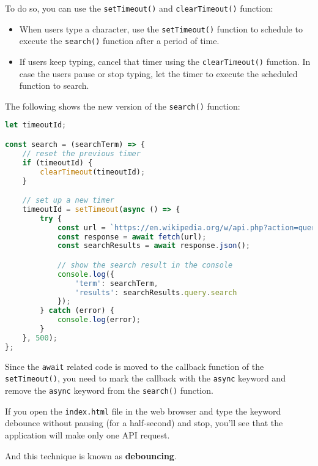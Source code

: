 \documentclass[11pt]{article}
\begin{document}
\noindent
To do so, you can use the \verb|setTimeout()| and \verb|clearTimeout()| function:

\begin{itemize}
\item When users type a character, use the \verb|setTimeout()| function to schedule
to execute the \verb|search()| function after a period of time.
\item If users keep typing, cancel that timer using the \verb|clearTimeout()| function.
In case the users pause or stop typing, let the timer to execute the
scheduled function to search.
\end{itemize}
\newpage
\noindent
The following shows the new version of the \verb|search()| function:

\begin{lstlisting}[language=JavaScript]
let timeoutId;

const search = (searchTerm) => {
    // reset the previous timer
    if (timeoutId) {
        clearTimeout(timeoutId);
    }

    // set up a new timer
    timeoutId = setTimeout(async () => {
        try {
            const url = `https://en.wikipedia.org/w/api.php?action=query&list=search&prop=info|extracts&inprop=url&utf8=&format=json&origin=*&srlimit=10&srsearch=${searchTerm}`;
            const response = await fetch(url);
            const searchResults = await response.json();

            // show the search result in the console
            console.log({
                'term': searchTerm,
                'results': searchResults.query.search
            });
        } catch (error) {
            console.log(error);
        }
    }, 500);
};
\end{lstlisting}

\noindent
Since the \verb|await| related code is moved to the callback function of
the \verb|setTimeout()|, you need to mark the callback with the \verb|async| keyword
and remove the \verb|async| keyword from the \verb|search()| function.
\newline

\noindent
If you open the \verb|index.html| file in the web browser and type the keyword
debounce without pausing (for a half-second) and stop, you'll see
that the application will make only one API request.
\newline

\noindent
And this technique is known as \textbf{debouncing}.

\end{document}
